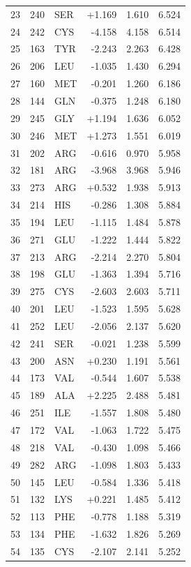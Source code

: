 \begin{longtable}{r l l r r r}
23 & 240 & SER & +1.169 & 1.610 & 6.524 \\
24 & 242 & CYS & -4.158 & 4.158 & 6.514 \\
25 & 163 & TYR & -2.243 & 2.263 & 6.428 \\
26 & 206 & LEU & -1.035 & 1.430 & 6.294 \\
27 & 160 & MET & -0.201 & 1.260 & 6.186 \\
28 & 144 & GLN & -0.375 & 1.248 & 6.180 \\
29 & 245 & GLY & +1.194 & 1.636 & 6.052 \\
30 & 246 & MET & +1.273 & 1.551 & 6.019 \\
31 & 202 & ARG & -0.616 & 0.970 & 5.958 \\
32 & 181 & ARG & -3.968 & 3.968 & 5.946 \\
33 & 273 & ARG & +0.532 & 1.938 & 5.913 \\
34 & 214 & HIS & -0.286 & 1.308 & 5.884 \\
35 & 194 & LEU & -1.115 & 1.484 & 5.878 \\
36 & 271 & GLU & -1.222 & 1.444 & 5.822 \\
37 & 213 & ARG & -2.214 & 2.270 & 5.804 \\
38 & 198 & GLU & -1.363 & 1.394 & 5.716 \\
39 & 275 & CYS & -2.603 & 2.603 & 5.711 \\
40 & 201 & LEU & -1.523 & 1.595 & 5.628 \\
41 & 252 & LEU & -2.056 & 2.137 & 5.620 \\
42 & 241 & SER & -0.021 & 1.238 & 5.599 \\
43 & 200 & ASN & +0.230 & 1.191 & 5.561 \\
44 & 173 & VAL & -0.544 & 1.607 & 5.538 \\
45 & 189 & ALA & +2.225 & 2.488 & 5.481 \\
46 & 251 & ILE & -1.557 & 1.808 & 5.480 \\
47 & 172 & VAL & -1.063 & 1.722 & 5.475 \\
48 & 218 & VAL & -0.430 & 1.098 & 5.466 \\
49 & 282 & ARG & -1.098 & 1.803 & 5.433 \\
50 & 145 & LEU & -0.584 & 1.336 & 5.418 \\
51 & 132 & LYS & +0.221 & 1.485 & 5.412 \\
52 & 113 & PHE & -0.778 & 1.188 & 5.319 \\
53 & 134 & PHE & -1.632 & 1.826 & 5.269 \\
54 & 135 & CYS & -2.107 & 2.141 & 5.252 \\

\end{longtable}

